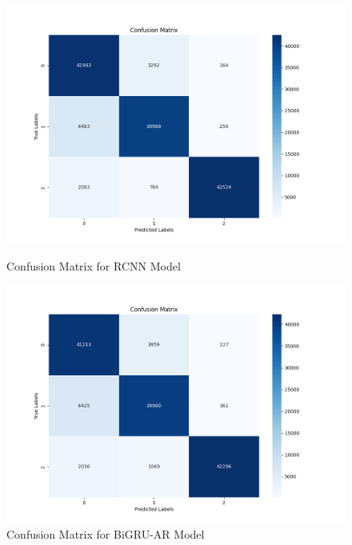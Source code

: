 \documentclass{article}
\begin{document}
\begin{figure}[H]
  \centering
  \begin{minipage}[b]{0.45\textwidth}
    \centering
    \includegraphics[width=0.9\linewidth]{RCNN_Text_Classifierconfusion_matrix_cnn.png}
    \caption{Confusion Matrix for RCNN Model}
    \label{fig:image1}
  \end{minipage}
  \hfill
  \begin{minipage}[b]{0.45\textwidth}
    \centering
    \includegraphics[width=0.9\linewidth]{BiGRU_Attention_Residualconfusion_matrix_cnn.png}
    \caption{Confusion Matrix for BiGRU-AR Model}
    \label{fig:image2}
  \end{minipage}
\end{figure}
\end{document}
